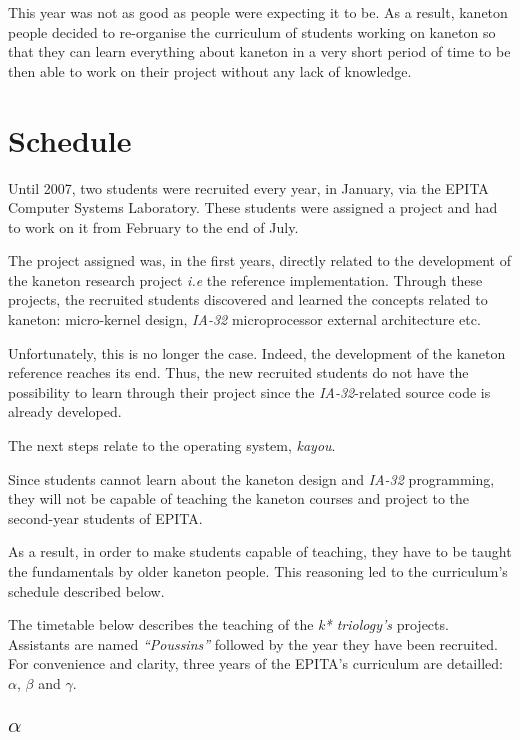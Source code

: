 \begin{multicols}{2}
This year was not as good as people were expecting it to be. As a result,
kaneton people decided to re-organise the curriculum of students working
on kaneton so that they can learn everything about kaneton in a very
short period of time to be then able to work on their project without any
lack of knowledge.

%
%

\section{Schedule}

Until 2007, two students were recruited every year, in January, via the EPITA
Computer Systems Laboratory. These students were assigned a project and had
to work on it from February to the end of July.

The project assigned was, in the first years, directly related to the
development of the kaneton research project \textit{i.e} the reference
implementation. Through these projects, the recruited students discovered
and learned the concepts related to kaneton: micro-kernel design,
\textit{IA-32} microprocessor external architecture etc.

Unfortunately, this is no longer the case. Indeed, the development of the
kaneton reference reaches its end. Thus, the new recruited students do not
have the possibility to learn through their project since the
\textit{IA-32}-related source code is already developed.

The next steps relate to the operating system, \textit{kayou}.

Since students cannot learn about the kaneton design and \textit{IA-32}
programming, they will not be capable of teaching the kaneton courses and
project to the second-year students of EPITA.

As a result, in order to make students capable of teaching, they have to
be taught the fundamentals by older kaneton people. This reasoning led to
the curriculum's schedule described below.

The timetable below describes the teaching of the \textit{k* triology's}
projects. Assistants are named \textit{``Poussins''} followed by the year
they have been recruited. For convenience and clarity, three years of the
EPITA's curriculum are detailled: $\alpha$, $\beta$ and $\gamma$.

%
%

\subsection{$\alpha$}


\end{multicols}
